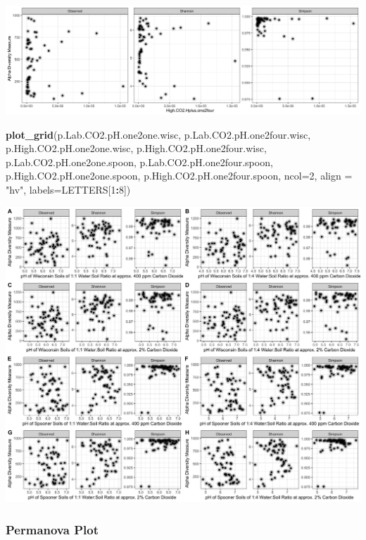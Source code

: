\documentclass[]{article}
\newenvironment{Shaded}{\begin{snugshade}}{\end{snugshade}}
\newcommand{\DataTypeTok}[1]{\textcolor[rgb]{0.13,0.29,0.53}{#1}}
\newcommand{\DecValTok}[1]{\textcolor[rgb]{0.00,0.00,0.81}{#1}}
\newcommand{\KeywordTok}[1]{\textcolor[rgb]{0.13,0.29,0.53}{\textbf{#1}}}
\newcommand{\NormalTok}[1]{#1}
\newcommand{\OperatorTok}[1]{\textcolor[rgb]{0.81,0.36,0.00}{\textbf{#1}}}
\newcommand{\StringTok}[1]{\textcolor[rgb]{0.31,0.60,0.02}{#1}}
\begin{document}
\includegraphics{output-rmd/richness-ph-High.CO2.Hplus.one2four.spoon-1.png}

\begin{Shaded}
\begin{Highlighting}[]
\KeywordTok{plot_grid}\NormalTok{(p.Lab.CO2.pH.one2one.wisc, p.Lab.CO2.pH.one2four.wisc, p.High.CO2.pH.one2one.wisc, p.High.CO2.pH.one2four.wisc, p.Lab.CO2.pH.one2one.spoon, p.Lab.CO2.pH.one2four.spoon, p.High.CO2.pH.one2one.spoon, p.High.CO2.pH.one2four.spoon, }\DataTypeTok{ncol=}\DecValTok{2}\NormalTok{, }\DataTypeTok{align =} \StringTok{"hv"}\NormalTok{, }\DataTypeTok{labels=}\NormalTok{LETTERS[}\DecValTok{1}\OperatorTok{:}\DecValTok{8}\NormalTok{])}
\end{Highlighting}
\end{Shaded}

\includegraphics{output-rmd/diversity-plot-1.png}

\hypertarget{permanova-plot}{%
\subsubsection{Permanova Plot}\label{permanova-plot}}
\end{document}
